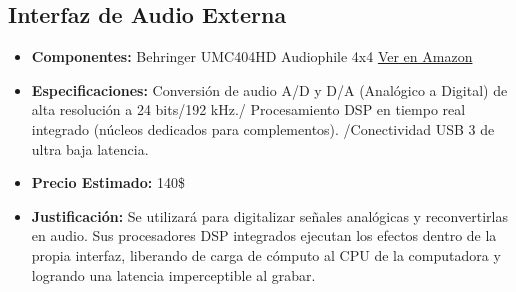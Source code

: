 \documentclass[12pt,a4paper]{article}
\begin{document}
\subsection{Interfaz de Audio Externa}
\begin{itemize}
    \item \textbf{Componentes:} Behringer UMC404HD Audiophile 4x4
    \href{https://www.amazon.com/-/es/Behringer-UMC404HD-Audiophile-preamplificadores-instrumentos/dp/B00TTX73YA/ref=sr_1_18?__mk_es_US=%C3%85M%C3%85%C5%BD%C3%95%C3%91&crid=3CA9UX2QWAQJP&dib=eyJ2IjoiMSJ9.P-4qeVd-HFO90mQ8U_r1evULTCS3vA2SVmMGuMeBT_kVXge70qRRk5-2sW-RIIchHBIDSbZlXzWiBsD6m-SC1_gOtcgjOBqqjpdjPGHkI1Ip_LmMmq6yA2KgCtjYLiU94k1efTSExjpyGtMD98tp4Vri68_h1iimfF6Ku3oBxisxMhBl9XfPerI-8bbrMi6UMFQdIRbCEJSUavJ20W04ZdWASbyKo6QS2AsjoH9r3kUr3ztcxeJQbuIn1SHmHMPfMHtmBsramV4Rh2ovGNxWY2lqiSToLfefTtEtJFtMXz4.wpYZXMS32AXZFasgAS1hclqx9u4-9SPi7Riekj6fkqg&dib_tag=se&keywords=interfaz+de+audio+profesional+24bits&qid=1779460202&sprefix=interfaz+de+audio+profesional+24bits+%2Caps%2C215&sr=8-18}{Ver en Amazon}
    \item \textbf{Especificaciones:} Conversión de audio A/D y D/A (Analógico a Digital) de alta resolución a 24 bits/192 kHz./ Procesamiento DSP en tiempo real integrado (núcleos dedicados para complementos). /Conectividad USB 3 de ultra baja latencia.
    \item \textbf{Precio Estimado:} 140\$
    \item \textbf{Justificación:} Se utilizará para digitalizar señales analógicas y reconvertirlas en audio. Sus procesadores DSP integrados ejecutan los efectos dentro de la propia interfaz, liberando de carga de cómputo al CPU de la computadora y logrando una latencia imperceptible al grabar.
\end{itemize}
\end{document}
